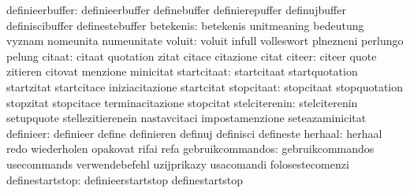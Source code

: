                  definieerbuffer: definieerbuffer                  definebuffer
                                  definierepuffer                  definujbuffer
                                  definiscibuffer                  definestebuffer
                       betekenis: betekenis                        unitmeaning
                                  bedeutung                        vyznam
                                  nomeunita                        numeunitate %
                          voluit: voluit                           infull
                                  volleswort                       plnezneni
                                  perlungo                         pelung
                          citaat: citaat                           quotation
                                  zitat                            citace
                                  citazione                        citat
                          citeer: citeer                           quote
                                  zitieren                         citovat
                                  menzione                         minicitat
                     startcitaat: startcitaat                      startquotation
                                  startzitat                       startcitace
                                  iniziacitazione                  startcitat
                      stopcitaat: stopcitaat                       stopquotation
                                  stopzitat                        stopcitace
                                  terminacitazione                 stopcitat
                   stelciterenin: stelciterenin                    setupquote
                                  stellezitierenein                nastavcitaci
                                  impostamenzione                  seteazaminicitat
                       definieer: definieer                        define
                                  definieren                       definuj
                                  definisci                        defineste
                         herhaal: herhaal                          redo
                                  wiederholen                      opakovat
                                  rifai                            refa
                gebruikcommandos: gebruikcommandos                 usecommands
                                  verwendebefehl                   uzijprikazy
                                  usacomandi                       folosestecomenzi
                 definestartstop: definieerstartstop               definestartstop
